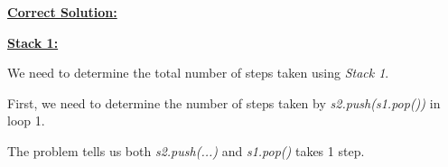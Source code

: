 \documentclass[12pt]{article}
\begin{document}
\begin{enumerate}[a.]
















    \begin{mdframed}

    \underline{\textbf{Correct Solution:}}

    \bigskip

    \underline{\textbf{Stack 1:}}

    \bigskip

    We need to determine the total number of steps taken using \textit{Stack 1}.

    \bigskip

    First, we need to determine the number of steps taken by \textit{s2.push(s1.pop())} \color{red}in loop 1\color{black}.

    \bigskip

    The problem tells us both \textit{s2.push(...)} and \textit{s1.pop()} takes 1 step.

    \bigskip


\end{mdframed}
\end{enumerate}
\end{document}
